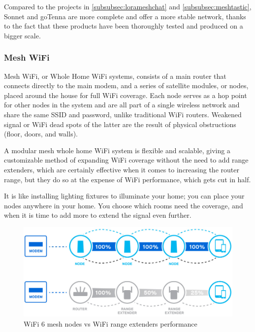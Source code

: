 				Compared to the projects in \ref{subsubsec:lorameshchat} and \ref{subsubsec:meshtastic}, Sonnet and goTenna are more complete and offer a more stable network, thanks to the fact that these products have been thoroughly tested and produced on a bigger scale.
						
			\subsubsection{Mesh WiFi}
					
				Mesh WiFi, or Whole Home WiFi systems, consists of a main router that connects directly to the main modem, and a series of satellite modules, or nodes, placed around the house for full WiFi coverage.
				Each node serves as a hop point for other nodes in the system and are all part of a single wireless network and share the same SSID and password, unlike traditional WiFi routers.
				Weakened signal or WiFi dead spots of the latter are the result of physical obstructions (floor, doors, and walls).
				
				A modular mesh whole home WiFi system is flexible and scalable, giving a customizable method of expanding WiFi coverage without the need to add range extenders, which are certainly effective when it comes to increasing the router range, but they do so at the expense of WiFi performance, which gets cut in half.
				
				It is like installing lighting fixtures to illuminate your home; you can place your nodes anywhere in your home. You choose which rooms need the coverage, and when it is time to add more to extend the signal even further. 				
			
				\begin{figure}
					\centering
					\includegraphics[width=\textwidth]{resources/img/chap4/wifi6}
					\caption{WiFi 6 mesh nodes vs WiFi range extenders performance}
					\label{img:wifi6}
				\end{figure}
				

